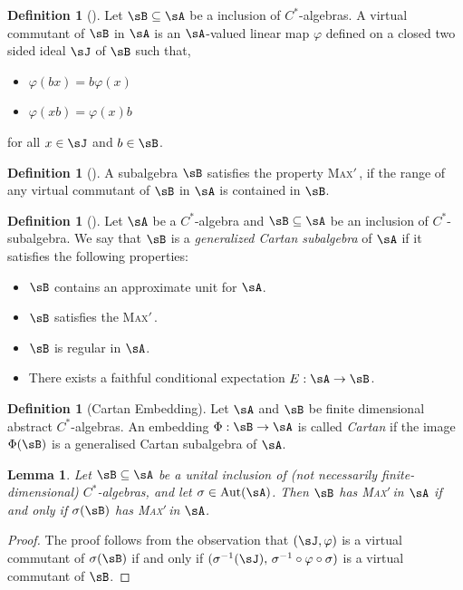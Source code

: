 \documentclass[12pt,a4paper]{amsart}
\theoremstyle{plain}
\newtheorem{lem}[theorem]{Lemma}
\theoremstyle{definition}
\newtheorem{definition}[theorem]{Definition}
\theoremstyle{remark}
\numberwithin{equation}{section}
\theoremstyle{ser}
\theoremstyle{serr}
\theoremstyle{ser}
\theoremstyle{ser}
\theoremstyle{collabquestion}
\newcommand{\<}{\langle}
\renewcommand{\>}{\rangle}
\newcommand{\maxprime}{\textsc{Max}$'$\,}
\begin{document}
\begin{definition}[{\cite[Definition 9.2]{Exel2011}}]
  Let $\sB\subseteq \sA$ be a inclusion of $C^*$-algebras. A virtual commutant of $\sB$ in $\sA$ is an $\sA$-valued  linear map $\varphi$ defined on a closed two sided ideal $\sJ$ of $\sB$ such that,
  \begin{itemize}
      \item[(i)] $\varphi(bx)= b\varphi (x)$
      \item[(ii)]$\varphi(xb)= \varphi (x)b$
  \end{itemize}
  for all $x\in \sJ$ and $b\in \sB$.
  \end{definition}
 \begin{definition}[{\cite[Definition 9.6]{Exel2011}}]
     A subalgebra $\sB$ satisfies the property \maxprime, if the range of any virtual commutant of $\sB$ in $\sA$ is contained in $\sB$.  
 \end{definition}
  

\begin{definition}[{\cite[Definition 12.1]{Exel2011}}]\label{def:gen_cartan}
  Let $\sA$ be a $C^*$-algebra and $\sB\subseteq \sA$ be an inclusion of $C^*$-subalgebra. We say that $\sB$ is a \emph{generalized Cartan subalgebra} of $\sA$ if it satisfies the following properties:
  \begin{itemize}
      \item[(i)] $\sB$ contains an approximate unit for $\sA$.
      \item[(ii)] $\sB$ satisfies the \maxprime.
      \item[(iii)] $\sB$ is regular in $\sA$.
      \item[(iv)] There exists a faithful conditional expectation $E: \sA \to \sB$. 
  \end{itemize}
\end{definition}

\begin{definition}[Cartan Embedding]
    Let $\sA$ and $\sB$ be finite dimensional abstract $C^*$-algebras. An embedding $\Phi:\sB \to \sA$ is called \emph{Cartan} if the image $\Phi(\sB)$ is a generalised Cartan subalgebra of $\sA$.
\end{definition}


\begin{lem}\label{lem:autmorph_pres_maxprime}
Let $\sB \subseteq \sA$ be a unital inclusion of (not necessarily finite-dimensional) $C^*$-algebras, and let $\sigma \in \textrm{Aut}(\sA)$. Then $\sB$ has \maxprime in $\sA$ if and only if $\sigma(\sB)$ has \maxprime in $\sA$.
\end{lem}
\begin{proof}
    The proof follows from the observation that $(\sJ, \varphi)$ is a virtual commutant of $\sigma(\sB)$ if and only if $(\sigma^{-1}(\sJ),\, \sigma^{-1} \circ \varphi \circ \sigma)$ is a virtual commutant of $\sB$.
\end{proof}
\end{document}
